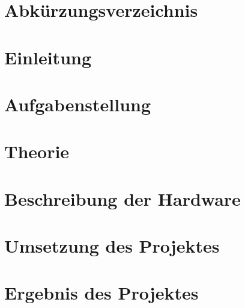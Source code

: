 \documentclass[ngerman]{scrartcl} %
\begin{document}
\thispagestyle{empty}
   


\newpage

\tableofcontents

\listoffigures

\listoftables 
 
\section*{Abkürzungsverzeichnis}
\label{sec:Abkürzungsverzeichnis}


\section{Einleitung}        
\label{sec:Einleitung-1}   
    

\section{Aufgabenstellung}
\label{sec:Aufgabenstellung-1}


\section{Theorie}        
\label{sec:Theorie-1}  

 
\section{Beschreibung der Hardware}        
\label{sec:Beschreibung der Hardware-1}  


\section{Umsetzung des Projektes}        
\label{sec:Umsetzung des Projektes-1}  


\section{Ergebnis des Projektes}        
\label{sec:Ergebnis des Projektes-1}  

\end{document}
